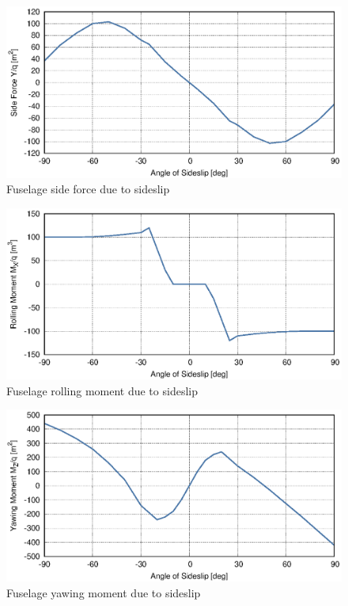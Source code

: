 \begin{figure}
  \centering
  \includegraphics[width=140mm]{eps/uh60_fuselage_beta_cy.eps}
  \caption{Fuselage side force due to sideslip \cite{NASA-CR-166309}}
\end{figure}

\begin{figure}
  \centering
  \includegraphics[width=140mm]{eps/uh60_fuselage_beta_cl.eps}
  \caption{Fuselage rolling moment due to sideslip \cite{NASA-CR-166309}}
\end{figure}

\begin{figure}
  \centering
  \includegraphics[width=140mm]{eps/uh60_fuselage_beta_cn.eps}
  \caption{Fuselage yawing moment due to sideslip \cite{NASA-CR-166309}}
\end{figure}


